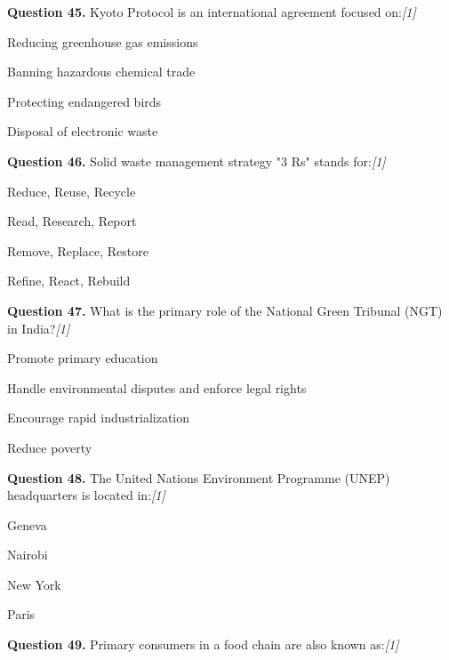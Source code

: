 \documentclass[11pt,a4paper]{article}
\newcommand{\pts}[1]{\hfill   \textit{[#1]}}
\begin{document}
\medskip


\noindent   \textbf{Question 45.} Kyoto Protocol is an international agreement focused on:\pts{1}

\begin{parts}
  \item Reducing greenhouse gas emissions
  \item Banning hazardous chemical trade
  \item Protecting endangered birds
  \item Disposal of electronic waste
\end{parts}

\medskip


\noindent   \textbf{Question 46.} Solid waste management strategy "3 Rs" stands for:\pts{1}

\begin{parts}
  \item Reduce, Reuse, Recycle
  \item Read, Research, Report
  \item Remove, Replace, Restore
  \item Refine, React, Rebuild
\end{parts}

\medskip


\noindent   \textbf{Question 47.} What is the primary role of the National Green Tribunal (NGT) in India?\pts{1}

\begin{parts}
  \item Promote primary education
  \item Handle environmental disputes and enforce legal rights
  \item Encourage rapid industrialization
  \item Reduce poverty
\end{parts}

\medskip


\noindent   \textbf{Question 48.} The United Nations Environment Programme (UNEP) headquarters is located in:\pts{1}

\begin{parts}
  \item Geneva
  \item Nairobi
  \item New York
  \item Paris
\end{parts}

\medskip


\noindent   \textbf{Question 49.} Primary consumers in a food chain are also known as:\pts{1}
\end{document}
